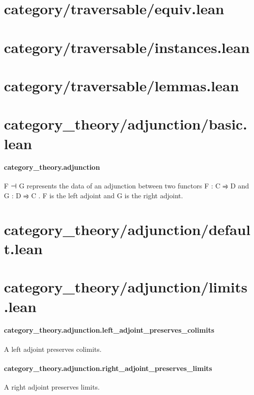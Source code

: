 \documentclass{article}
\begin{document}
\section{category/traversable/equiv.lean}\section{category/traversable/instances.lean}\section{category/traversable/lemmas.lean}\section{category\_theory/adjunction/basic.lean}\paragraph{category\_theory.adjunction}
\par
\colorbox[RGB]{253,246,227}{{{{\color[RGB]{101, 123, 131} F ⊣ G }}}} represents the data of an adjunction between two functors
\colorbox[RGB]{253,246,227}{{{{\color[RGB]{101, 123, 131} F : C ⥤ D }}}} and 
\colorbox[RGB]{253,246,227}{{{{\color[RGB]{101, 123, 131} G : D ⥤ C }}}}. 
\colorbox[RGB]{253,246,227}{{{{\color[RGB]{101, 123, 131} F }}}} is the left adjoint and 
\colorbox[RGB]{253,246,227}{{{{\color[RGB]{101, 123, 131} G }}}} is the right adjoint.
\section{category\_theory/adjunction/default.lean}\section{category\_theory/adjunction/limits.lean}\paragraph{category\_theory.adjunction.left\_adjoint\_preserves\_colimits}
\par
A left adjoint preserves colimits.
\paragraph{category\_theory.adjunction.right\_adjoint\_preserves\_limits}
\par
A right adjoint preserves limits.
\end{document}
